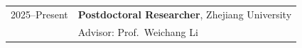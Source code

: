 
\begin{longtable}{@{}p{}p{}@{}}

2025--Present & \textbf{Postdoctoral Researcher}, Zhejiang University \\ 
           & Advisor: Prof.\ Weichang Li \\[0.5em]
\end{longtable}
